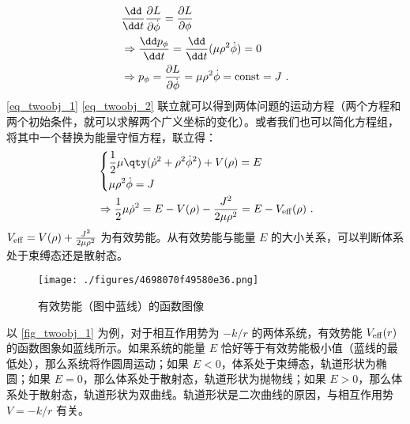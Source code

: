 \begin{equation}\label{eq_twoobj_2}
\begin{aligned}
&\frac{\dd }{\dd t}\frac{\partial L}{\partial \dot\phi}=\frac{\partial L}{\partial \phi}\\&
\Rightarrow \frac{\dd p_\phi}{\dd t}=\frac{\dd }{\dd t}(\mu \rho^2\dot\phi)=0
\\&
\Rightarrow p_\phi=\frac{\partial L}{\partial \dot \phi}=\mu\rho^2\dot\phi ={\rm const}=J ~.
\end{aligned}
\end{equation}
\autoref{eq_twoobj_1} \autoref{eq_twoobj_2} 联立就可以得到两体问题的运动方程（两个方程和两个初始条件，就可以求解两个广义坐标的变化）。或者我们也可以简化方程组，将其中一个替换为能量守恒方程，联立得：
\begin{equation}\label{eq_twoobj_3}
\begin{aligned}
&\left\{
\begin{aligned}
&\frac{1}{2}\mu \qty(\dot\rho^2+\rho^2\dot\phi^2)+V(\rho)=E\\
&\mu\rho^2\dot\phi=J
\end{aligned}
\right.\\
&\Rightarrow \frac{1}{2}\mu \dot\rho^2=E-V(\rho)-\frac{J^2}{2\mu\rho^2}=E-V_{\rm{eff}}(\rho)~.
\end{aligned}
\end{equation}
$V_{\rm{eff}}=V(\rho)+\frac{J^2}{2\mu\rho^2}$ 为有效势能。从有效势能与能量 $E$ 的大小关系，可以判断体系处于束缚态还是散射态。
\begin{figure}[ht]
\centering
\texttt{[image: ./figures/4698070f49580e36.png]}
\caption{有效势能（图中蓝线）的函数图像} \label{fig_twoobj_1}
\end{figure}
以 \autoref{fig_twoobj_1} 为例，对于相互作用势为 $-k/r$ 的两体系统，有效势能 $V_{\rm{eff}}(r)$ 的函数图象如蓝线所示。如果系统的能量 $E$ 恰好等于有效势能极小值（蓝线的最低处），那么系统将作圆周运动；如果 $E<0$，体系处于束缚态，轨道形状为椭圆；如果 $E=0$，那么体系处于散射态，轨道形状为抛物线；如果 $E>0$，那么体系处于散射态，轨道形状为双曲线。轨道形状是二次曲线的原因，与相互作用势 $V=-k/r$ 有关。

